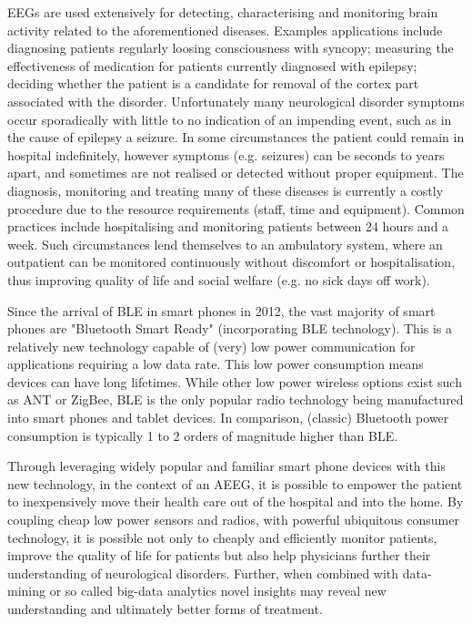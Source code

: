 \documentclass[]{article}
\begin{document}
\ac{EEG}s are used extensively for detecting, characterising and monitoring brain activity related to the aforementioned diseases. Examples applications include diagnosing patients regularly loosing consciousness with syncopy; measuring the effectiveness of medication for patients currently diagnosed with epilepsy\cite{Duncan2006}; deciding whether the patient is a candidate for removal of the cortex part associated with the disorder\cite{Zijlmans2007}. Unfortunately many neurological disorder symptoms occur sporadically with little to no indication of an impending event, such as in the cause of epilepsy a seizure. In some circumstances the patient could remain in hospital indefinitely, however symptoms (e.g. seizures) can be seconds to years apart, and sometimes are not realised or detected without proper equipment. The diagnosis, monitoring and treating many of these diseases is currently a costly procedure due to the resource requirements (staff, time and equipment). Common practices include hospitalising and monitoring patients between 24 hours and a week.  Such circumstances lend themselves to an ambulatory system, where an outpatient can be monitored continuously without discomfort or hospitalisation, thus improving quality of life and social welfare (e.g. no sick days off work).

Since the arrival of \ac{BLE} in smart phones in 2012, the vast majority of smart phones are "Bluetooth Smart Ready" (incorporating \ac{BLE} technology). This is a relatively new technology capable of (very) low power communication for applications requiring a low data rate. This low power consumption means devices can have long lifetimes. While other low power wireless options exist such as ANT or ZigBee, \ac{BLE} is the only popular radio technology being manufactured into smart phones and tablet devices. In comparison, (classic) Bluetooth power consumption is typically 1 to 2 orders of magnitude higher than \ac{BLE}.

 Through leveraging widely popular and familiar smart phone devices with this new technology, in the context of an \ac{AEEG}, it is possible to empower the patient to inexpensively move their health care out of the hospital and into the home. By coupling cheap low power sensors and radios, with powerful ubiquitous consumer technology, it is possible not only to cheaply and efficiently monitor patients, improve the quality of life for patients but also help physicians further their understanding of neurological disorders. Further, when combined with data-mining or so called big-data analytics novel insights may reveal new understanding and ultimately better forms of treatment.
\end{document}
